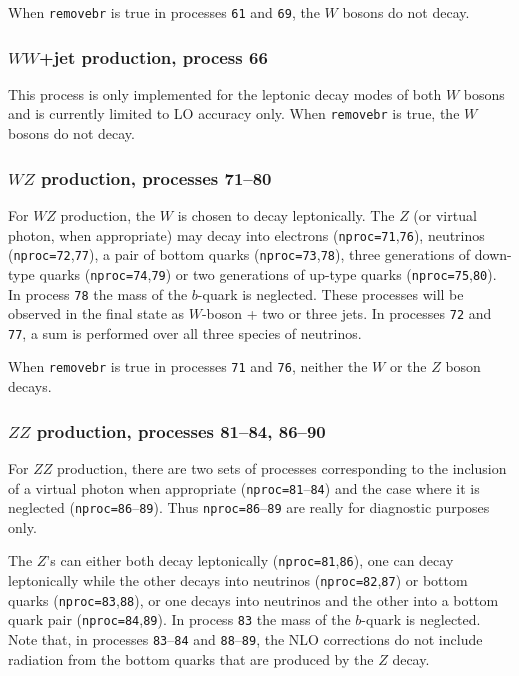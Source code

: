 \documentclass[12pt]{article}
\begin{document}
When {\tt removebr} is true in processes {\tt 61} and {\tt 69},
the $W$ bosons do not decay.

\subsubsection{$WW$+jet production, process 66}

This process is only implemented for the leptonic decay modes of both $W$
bosons and is currently limited to LO accuracy only. When {\tt removebr} is true,
the $W$ bosons do not decay.

\subsubsection{$WZ$ production, processes 71--80}

For $WZ$ production, the $W$ is chosen to decay leptonically. The $Z$ (or
virtual photon, when appropriate) may decay into electrons
({\tt nproc=71},{\tt 76}), neutrinos ({\tt nproc=72},{\tt 77}), a
pair of bottom quarks ({\tt nproc=73},{\tt 78}), three generations of down-type
quarks ({\tt nproc=74},{\tt 79}) or two generations of up-type quarks ({\tt nproc=75},{\tt 80}).
In process {\tt 78} the mass of the $b$-quark is neglected.
These processes will be observed
in the final state as $W$-boson + two or three jets.
In processes {\tt 72} and {\tt 77}, a sum is performed over all three species of neutrinos.

When {\tt removebr} is true in processes {\tt 71} and {\tt 76},
neither the $W$ or the $Z$ boson decays.

\subsubsection{$ZZ$ production, processes 81--84, 86--90}

For $ZZ$ production, there are two sets of processes corresponding to the
inclusion of a virtual photon when appropriate ({\tt nproc=81}--{\tt 84})
and the case where it is neglected ({\tt nproc=86}--{\tt 89}).
Thus {\tt nproc=86}--{\tt 89} are really for diagnostic purposes only.

The $Z$'s can either both decay leptonically ({\tt nproc=81},{\tt 86}),
one can decay leptonically while the other decays into neutrinos
({\tt nproc=82},{\tt 87}) or bottom quarks ({\tt nproc=83},{\tt 88}), or
one decays into neutrinos and the other into a bottom quark pair
({\tt nproc=84},{\tt 89}).
In process {\tt 83} the mass of the $b$-quark is neglected. Note that, in processes
{\tt 83}--{\tt 84} and {\tt 88}--{\tt 89}, the NLO corrections do not include
radiation from the bottom quarks that are produced by the $Z$ decay.
\end{document}
